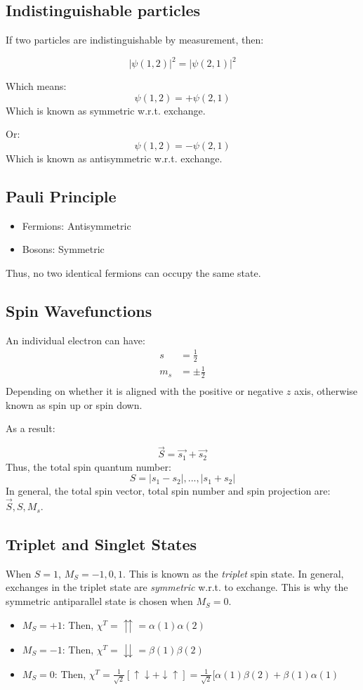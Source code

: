 \documentclass[12pt]{article}
\begin{document}
\subsection{Indistinguishable particles}

If two particles are indistinguishable by measurement, then:

\[ |\psi(1,2)|^2 = |\psi(2,1)|^2\]

Which means:
\[ \psi(1,2) = +\psi(2,1)\]
Which is known as symmetric w.r.t. exchange.

Or:
\[ \psi(1,2) = -\psi(2,1)\]
Which is known as antisymmetric w.r.t. exchange.

\subsection{Pauli Principle}

\begin{itemize}
    \item Fermions: Antisymmetric
    \item Bosons: Symmetric
\end{itemize}

Thus, no two identical fermions can occupy the same state.

\subsection{Spin Wavefunctions}

An individual electron can have:
\begin{align*}
    s &= \frac{1}{2}\\
    m_s &= \pm\frac12\\
\end{align*}
Depending on whether it is aligned with the positive or negative $z$ axis, otherwise known as spin up or spin down.

As a result:

\[\vec{S} = \vec{s_1} + \vec{s_2}\]
Thus, the total spin quantum number:
\[S = |s_1-s_2|,...,|s_1+s_2|\]
In general, the total spin vector, total spin number and spin projection are: $\vec{S}, S, M_s$.

\subsection{Triplet and Singlet States}

When $S=1$, $M_S = -1,0,1$. This is known as the \textit{triplet} spin state. In general, exchanges in the triplet state are \textit{symmetric} w.r.t. to exchange. This is why the symmetric antiparallel state is chosen when $M_S = 0$.
\begin{itemize}
    \item $M_S = +1$: Then, $\chi^T = \upuparrows = \alpha(1)\alpha(2)$
    \item $M_S = -1$: Then, $\chi^T = \downdownarrows = \beta(1)\beta(2)$
    \item $M_S=0$: Then, $\chi^T = \frac{1}{\sqrt{2}}[\uparrow\downarrow + \downarrow\uparrow] = \frac{1}{\sqrt{2}}[\alpha(1)\beta(2)+\beta(1)\alpha(1)$
\end{itemize}
\end{document}
